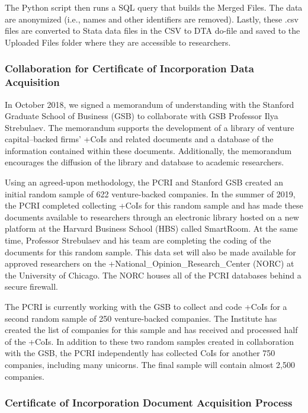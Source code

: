 \documentclass[
]{WileySix}
\begin{document}
The Python script then runs a SQL query that builds the Merged Files. The data are anonymized (i.e., names and other identifiers are removed). Lastly, these .csv files are converted to Stata data files in the CSV to DTA do-file and saved to the Uploaded Files folder where they are accessible to researchers.

\hypertarget{collaboration-for-certificate-of-incorporation-data-acquisition}{%
\subsubsection{Collaboration for Certificate of Incorporation Data Acquisition}\label{collaboration-for-certificate-of-incorporation-data-acquisition}}

In October 2018, we signed a memorandum of understanding with the Stanford Graduate School of Business (GSB) to collaborate with GSB Professor Ilya Strebulaev. The memorandum supports the development of a library of venture capital--backed firms' +CoIs\textbar{} and related documents and a database of the information contained within these documents. Additionally, the memorandum encourages the diffusion of the library and database to academic researchers.

Using an agreed-upon methodology, the PCRI and Stanford GSB created an initial random sample of 622 venture-backed companies. In the summer of 2019, the PCRI completed collecting +CoIs\textbar{} for this random sample and has made these documents available to researchers through an electronic library hosted on a new platform at the Harvard Business School (HBS) called SmartRoom. At the same time, Professor Strebulaev and his team are completing the coding of the documents for this random sample. This data set will also be made available for approved researchers on the +National\_Opinion\_Research\_Center\textbar{} (NORC) at the University of Chicago. The NORC houses all of the PCRI databases behind a secure firewall.

The PCRI is currently working with the GSB to collect and code +CoIs\textbar{} for a second random sample of 250 venture-backed companies. The Institute has created the list of companies for this sample and has received and processed half of the +CoIs\textbar. In addition to these two random samples created in collaboration with the GSB, the PCRI independently has collected CoIs for another 750 companies, including many unicorns. The final sample will contain almost 2,500 companies.

\hypertarget{certificate-of-incorporation-document-acquisition-process}{%
\subsubsection{Certificate of Incorporation Document Acquisition Process}\label{certificate-of-incorporation-document-acquisition-process}}
\end{document}
